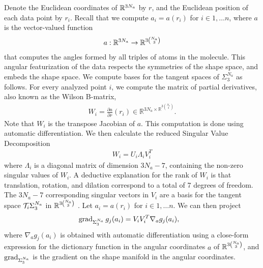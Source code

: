 Denote the Euclidean coordinates of $ {\mathbb R}^{3N_a}$ by $r$, and the Euclidean position of each data point by $r_i$. Recall that we compute $a_i = a(r_i)$ for $i \in 1, \dotsc n$, where $a$ is the vector-valued function
\begin{align*}
a: {\mathbb R}^{3N_a} \to {\mathbb R}^{3{N_a \choose 3}}
\end{align*}
that computes the angles formed by all triples of atoms in the molecule. This angular featurization of the data respects the symmetries of the shape space, and embeds the shape space.
We compute bases for the tangent spaces of $\Sigma_3^{N_a}$ as follows. For every analyzed point $i$, we compute the matrix of partial derivatives, also known as the Wilson B-matrix,
\begin{align*}
W_i = \frac{\partial a}{\partial r} (r_i) \in \mathbb R^{3N_a \times \mathbb R^{3 {N_a \choose 3}}}.
\end{align*}
Note that $W_i$ is the transpose Jacobian of $a$. 
This computation is done using automatic differentiation. We then calculate the reduced Singular Value Decomposition
\begin{align*}
W_i = U_i \Lambda_i V_i^T
\end{align*}
where  $\Lambda_i$ is a diagonal matrix of dimension $3N_a - 7$, containing the non-zero singular values of $W_i$. A deductive explanation for the rank of $W_i$ is that translation, rotation, and dilation correspond to a total of 7 degrees of freedom. The $3N_a - 7$ corresponding singular vectors in $V_i$ are a basis for the tangent space ${\cal T}_i  \Sigma_3^{N_a}$ in ${\mathbb R}^{3 {N_a \choose 3}}$ \citep{addicoatcollins:2010}. Let $a_i = a(r_i)$ for $i \in 1, \dotsc n$. We can then project
\begin{align*}
\operatorname{grad}_{\Sigma_3^{N_a}} g_j (a_i) &= V_i V_i^T \nabla_{a} g_j (a_i),
\end{align*}
where $\nabla_a g_j (a_i)$ is obtained with automatic differentiation using a close-form expression for the dictionary function in the angular coordinates $a$ of ${\mathbb R}^{3 {N_a \choose 3}}$, and $\operatorname{grad}_{\Sigma_3^{N_a}}$ is the gradient on the shape manifold in the angular coordinates.

